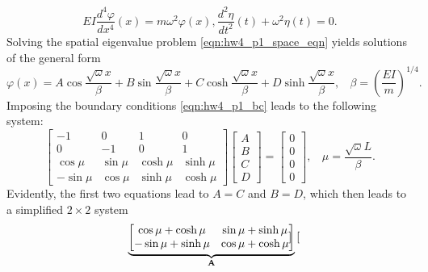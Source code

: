 \begin{enumerate}[(i)]
{\begin{subequations}
    \begin{equation}\label{eqn:hw4_p1_space_eqn}
        EI \frac{d^4 \varphi}{dx^4}(x) = m \omega^2 \varphi(x),
    \end{equation}
    \begin{equation}
        \frac{d^2 \eta}{dt^2}(t) + \omega^2 \eta(t) = 0.
    \end{equation}
    \end{subequations} 
    Solving the spatial eigenvalue problem \cref{eqn:hw4_p1_space_eqn} yields solutions of the general form 
    \begin{equation}
        \varphi(x) = A \cos \frac{\sqrt{\omega}x}{\beta} + B \sin \frac{\sqrt{\omega}x}{\beta} + C \cosh \frac{\sqrt{\omega}x}{\beta} + D \sinh \frac{\sqrt{\omega}x}{\beta}, ~~~~ \beta = {\left(\frac{EI}{m}\right)}^{1/4}.
    \end{equation}
    Imposing the boundary conditions \cref{eqn:hw4_p1_bc} leads to the following system:
    \begin{equation}\label{eqn:hw4_p1_eigen}
        \begin{bmatrix}
            -1 & 0 & 1 & 0 \\
            0 & -1 & 0 & 1 \\
            \cos\mu & \sin\mu & \cosh\mu & \sinh\mu \\
            -\sin\mu & \cos\mu & \sinh\mu & \cosh\mu
        \end{bmatrix} \begin{bmatrix}
            A \\ B \\ C \\ D
        \end{bmatrix} = \begin{bmatrix}
            0 \\ 0 \\ 0 \\ 0
        \end{bmatrix}, ~~~~ \mu = \frac{\sqrt{\omega}L}{\beta}.
    \end{equation}
    Evidently, the first two equations lead to $A=C$ and $B=D$, which then leads to a simplified $2\times 2$ system 
    \begin{equation}\label{eqn:hw4_p1_eigen_simp}
        \underbrace{\begin{bmatrix}
            \cos\mu + \cosh\mu & \sin\mu + \sinh\mu \\
            -\sin\mu + \sinh\mu & \cos\mu + \cosh\mu
        \end{bmatrix}}_{\mathbf{A}} \begin{bmatrix}

\end{bmatrix}
\end{equation}}
\end{enumerate}
